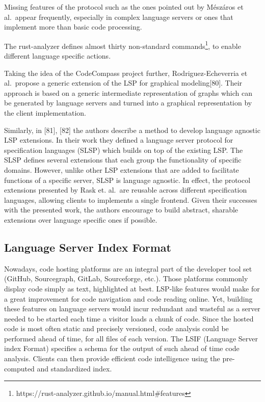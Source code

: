 \documentclass[
  a4paper,
  bibtex,
  english,
  nomenclature]{kthlatex/kththesis/kththesis}
\begin{document}
Missing features of the protocol such as the ones pointed out by
Mészáros et al.~appear frequently, especially in complex language
servers or ones that implement more than basic code processing.

The rust-analyzer defines almost thirty non-standard
commands\footnote{https://rust-analyzer.github.io/manual.html\#features},
to enable different language specific actions.

Taking the idea of the CodeCompass project further, Rodriguez-Echeverria
et al.~propose a generic extension of the LSP for graphical
modeling{[}80{]}. Their approach is based on a generic intermediate
representation of graphs which can be generated by language servers and
turned into a graphical representation by the client implementation.

Similarly, in {[}81{]}, {[}82{]} the authors describe a method to
develop language agnostic LSP extensions. In their work they defined a
language server protocol for specification languages (SLSP) which builds
on top of the existing LSP. The SLSP defines several extensions that
each group the functionality of specific domains. However, unlike other
LSP extensions that are added to facilitate functions of a specific
server, SLSP is language agnostic. In effect, the protocol extensions
presented by Rask et. al.~are reusable across different specification
languages, allowing clients to implements a single frontend. Given their
successes with the presented work, the authors encourage to build
abstract, sharable extensions over language specific ones if possible.

\hypertarget{sec:language-server-index-format}{%
\subsection{Language Server Index
Format}\label{sec:language-server-index-format}}

Nowadays, code hosting platforms are an integral part of the developer
tool set (GitHub, Sourcegraph, GitLab, Sourceforge, etc.). Those
platforms commonly display code simply as text, highlighted at best.
LSP-like features would make for a great improvement for code navigation
and code reading online. Yet, building these features on language
servers would incur redundant and wasteful as a server needed to be
started each time a visitor loads a chunk of code. Since the hosted code
is most often static and precisely versioned, code analysis could be
performed ahead of time, for all files of each version. The LSIF
(Language Server index Format) specifies a schema for the output of such
ahead of time code analysis. Clients can then provide efficient code
intelligence using the pre-computed and standardized index.
\end{document}
